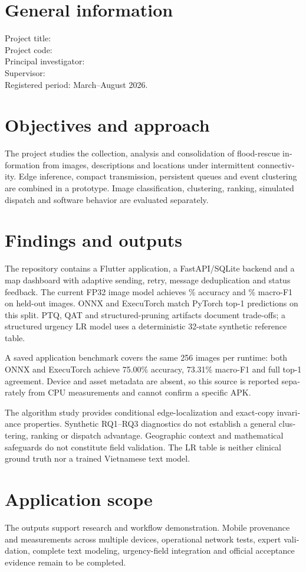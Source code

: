 \begin{english}
\section*{General information}
Project title: \ProjectTitleEnglish\\Project code: \ProjectCode\\
Principal investigator: \PrincipalName\\Supervisor: \SupervisorName\\
Registered period: March--August 2026.
\section*{Objectives and approach}
The project studies the collection, analysis and consolidation of flood-rescue information from images, descriptions and locations under intermittent connectivity. Edge inference, compact transmission, persistent queues and event clustering are combined in a prototype. Image classification, clustering, ranking, simulated dispatch and software behavior are evaluated separately.
\section*{Findings and outputs}
The repository contains a Flutter application, a FastAPI/SQLite backend and a map dashboard with adaptive sending, retry, message deduplication and status feedback. The current FP32 image model achieves \ImageAccuracy\% accuracy and \ImageMacroFOne\% macro-F1 on \ImageTest{} held-out images. ONNX and ExecuTorch match PyTorch top-1 predictions on this split. PTQ, QAT and structured-pruning artifacts document trade-offs; a structured urgency LR model uses a deterministic 32-state synthetic reference table.

A saved application benchmark covers the same 256 images per runtime: both ONNX and ExecuTorch achieve 75.00\% accuracy, 73.31\% macro-F1 and full top-1 agreement. Device and asset metadata are absent, so this source is reported separately from CPU measurements and cannot confirm a specific APK.

The algorithm study provides conditional edge-localization and exact-copy invariance properties. Synthetic RQ1--RQ3 diagnostics do not establish a general clustering, ranking or dispatch advantage. Geographic context and mathematical safeguards do not constitute field validation. The LR table is neither clinical ground truth nor a trained Vietnamese text model.
\section*{Application scope}
The outputs support research and workflow demonstration. Mobile provenance and measurements across multiple devices, operational network tests, expert validation, complete text modeling, urgency-field integration and official acceptance evidence remain to be completed.
\end{english}
